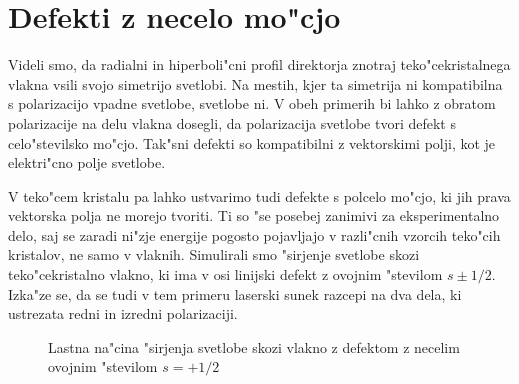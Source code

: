 \documentclass[12pt,twoside,openright,final]{report}
\begin{document}
\section{Defekti z necelo mo"cjo}

Videli smo, da radialni in hiperboli"cni profil direktorja znotraj teko"cekristalnega vlakna vsili svojo simetrijo svetlobi. 
Na mestih, kjer ta simetrija ni kompatibilna s polarizacijo vpadne svetlobe, svetlobe ni. 
V obeh primerih bi lahko z obratom polarizacije na delu vlakna dosegli, da polarizacija svetlobe tvori defekt s celo"stevilsko mo"cjo. 
Tak"sni defekti so kompatibilni z vektorskimi polji, kot je elektri"cno polje svetlobe. 

V teko"cem kristalu pa lahko ustvarimo tudi defekte s polcelo mo"cjo, ki jih prava vektorska polja ne morejo tvoriti. 
Ti so "se posebej zanimivi za eksperimentalno delo, saj se zaradi ni"zje energije pogosto pojavljajo v razli"cnih vzorcih teko"cih kristalov, ne samo v vlaknih. 
Simulirali smo "sirjenje svetlobe skozi teko"cekristalno vlakno, ki ima v osi linijski defekt z ovojnim "stevilom $s \pm 1/2$. 
Izka"ze se, da se tudi v tem primeru laserski sunek razcepi na dva dela, ki ustrezata redni in izredni polarizaciji. 

\begin{figure}[!htbp]
 \centering
 \caption{Lastna na"cina "sirjenja svetlobe skozi vlakno z defektom z necelim ovojnim "stevilom $s=+1/2$}
 \label{fig:pulse-p12-mode}
\end{figure}
\end{document}
